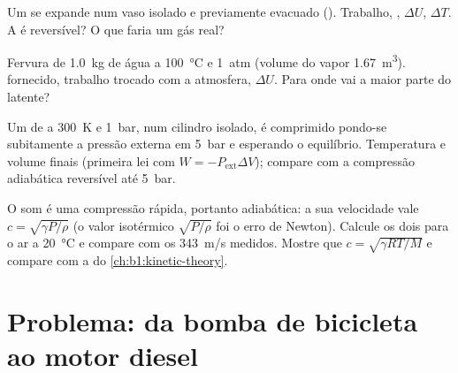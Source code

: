 \begin{exercise}[$\star\star$]\label{exo:b1:first-law:9}
Um  se expande num vaso isolado e previamente evacuado (). Trabalho, , $\Delta U$, $\Delta T$. A  é
reversível? O que faria um gás real?
\end{exercise}

\begin{exercise}[$\star\star\star$]\label{exo:b1:first-law:10}
Fervura de \qty{1.0}{kg} de água a \qty{100}{\degreeCelsius} e \qty{1}{atm}
(volume do vapor \qty{1.67}{m^3}).  fornecido, trabalho trocado com a
atmosfera, $\Delta U$. Para onde vai a maior parte do  latente?
\end{exercise}

\begin{exercise}[$\star\star\star$]\label{exo:b1:first-law:11}
Um  de  a \qty{300}{K} e \qty{1}{bar}, num cilindro
isolado, é comprimido pondo-se subitamente a pressão externa em
\qty{5}{bar} e esperando o equilíbrio. Temperatura e volume finais
(primeira lei com $W = -P_{\mathrm{ext}}\Delta V$); compare com a compressão
adiabática reversível até \qty{5}{bar}.
\end{exercise}

\begin{exercise}[$\star\star\star$]\label{exo:b1:first-law:12}
O som é uma compressão rápida, portanto adiabática: a sua velocidade vale $c = \sqrt{\gamma P/\rho}$
(o valor isotérmico $\sqrt{P/\rho}$ foi o erro de Newton). Calcule os dois
para o ar a \qty{20}{\degreeCelsius} e compare com os \qty{343}{m/s} medidos.
Mostre que $c = \sqrt{\gamma RT/M}$ e compare com a  do \cref{ch:b1:kinetic-theory}.
\end{exercise}

\section{Problema: da bomba de bicicleta ao motor diesel}

